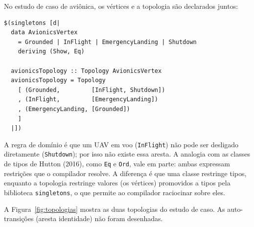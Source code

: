 \documentclass[12pt,a4paper]{article}
\begin{document}
No estudo de caso de aviônica, os vértices e a topologia são declarados juntos:

\begin{verbatim}
$(singletons [d|
  data AvionicsVertex
    = Grounded | InFlight | EmergencyLanding | Shutdown
    deriving (Show, Eq)

  avionicsTopology :: Topology AvionicsVertex
  avionicsTopology = Topology
    [ (Grounded,         [InFlight, Shutdown])
    , (InFlight,         [EmergencyLanding])
    , (EmergencyLanding, [Grounded])
    ]
  |])
\end{verbatim}

A regra de domínio é que um UAV em voo (\texttt{InFlight}) não pode ser desligado diretamente (\texttt{Shutdown}); por isso não existe essa aresta. A analogia com as classes de tipos de Hutton (2016), como \texttt{Eq} e \texttt{Ord}, vale em parte: ambas expressam restrições que o compilador resolve. A diferença é que uma classe restringe tipos, enquanto a topologia restringe valores (os vértices) promovidos a tipos pela biblioteca \texttt{singletons}, o que permite ao compilador raciocinar sobre eles.

A Figura~\ref{fig:topologias} mostra as duas topologias do estudo de caso. As auto-transições (aresta identidade) não foram desenhadas.
\end{document}
